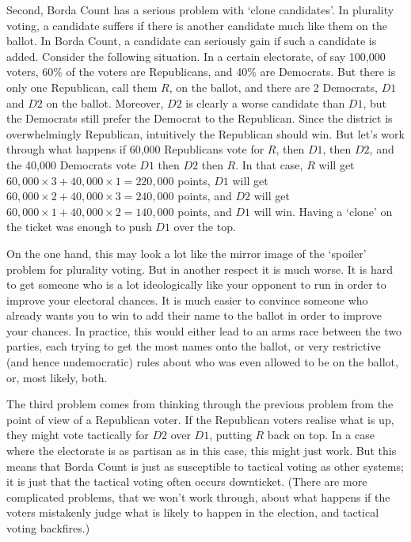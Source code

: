 \begin{multicols}{2}
Second, Borda Count has a serious problem with `clone candidates'. In plurality voting, a candidate suffers if there is another candidate much like them on the ballot. In Borda Count, a candidate can seriously gain if such a candidate is added. Consider the following situation. In a certain electorate, of say 100,000 voters, 60\% of the voters are Republicans, and 40\% are Democrats. But there is only one Republican, call them $R$, on the ballot, and there are 2 Democrats, $D1$ and $D2$ on the ballot. Moreover, $D2$ is clearly a worse candidate than $D1$, but the Democrats still prefer the Democrat to the Republican. Since the district is overwhelmingly Republican, intuitively the Republican should win. But let's work through what happens if 60,000 Republicans vote for $R$, then $D1$, then $D2$, and the 40,000 Democrats vote $D1$ then $D2$ then $R$. In that case, $R$ will get $60,000 \times 3 + 40,000 \times 1 = 220,000$ points, $D1$ will get $60,000 \times 2 + 40,000 \times 3 = 240,000$ points, and $D2$ will get $60,000 \times 1 + 40,000 \times 2 = 140,000$ points, and $D1$ will win. Having a `clone' on the ticket was enough to push $D1$ over the top.

On the one hand, this may look a lot like the mirror image of the `spoiler' problem for plurality voting. But in another respect it is much worse. It is hard to get someone who is a lot ideologically like your opponent to run in order to improve your electoral chances. It is much easier to convince someone who already wants you to win to add their name to the ballot in order to improve your chances. In practice, this would either lead to an arms race between the two parties, each trying to get the most names onto the ballot, or very restrictive (and hence undemocratic) rules about who was even allowed to be on the ballot, or, most likely, both.

The third problem comes from thinking through the previous problem from the point of view of a Republican voter. If the Republican voters realise what is up, they might vote tactically for $D2$ over $D1$, putting $R$ back on top. In a case where the electorate is as partisan as in this case, this might just work. But this means that Borda Count is just as susceptible to tactical voting as other systems; it is just that the tactical voting often occurs downticket. (There are more complicated problems, that we won't work through, about what happens if the voters mistakenly judge what is likely to happen in the election, and tactical voting backfires.)


\end{multicols}
